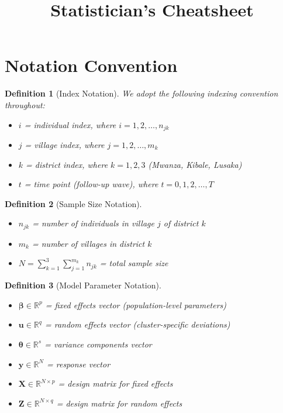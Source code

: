 \documentclass{article}
\title{Statistician's Cheatsheet}
\author{}
\date{}
\newtheorem{definition}{Definition}
\begin{document}
\maketitle
\newpage
\section{Notation Convention}

\begin{definition}[Index Notation]
We adopt the following indexing convention throughout:
\begin{itemize}
    \item $i$ = individual index, where $i = 1, 2, \ldots, n_{jk}$
    \item $j$ = village index, where $j = 1, 2, \ldots, m_k$
    \item $k$ = district index, where $k = 1, 2, 3$ (Mwanza, Kibale, Lusaka)
    \item $t$ = time point (follow-up wave), where $t = 0, 1, 2, \ldots, T$
\end{itemize}
\end{definition}

\begin{definition}[Sample Size Notation]
\begin{itemize}
    \item $n_{jk}$ = number of individuals in village $j$ of district $k$
    \item $m_k$ = number of villages in district $k$
    \item $N = \sum_{k=1}^{3} \sum_{j=1}^{m_k} n_{jk}$ = total sample size
\end{itemize}
\end{definition}

\begin{definition}[Model Parameter Notation]
\begin{itemize}
    \item $\boldsymbol{\beta} \in \mathbb{R}^p$ = fixed effects vector (population-level parameters)
    \item $\mathbf{u} \in \mathbb{R}^q$ = random effects vector (cluster-specific deviations)
    \item $\boldsymbol{\theta} \in \mathbb{R}^s$ = variance components vector
    \item $\mathbf{y} \in \mathbb{R}^N$ = response vector
    \item $\mathbf{X} \in \mathbb{R}^{N \times p}$ = design matrix for fixed effects
    \item $\mathbf{Z} \in \mathbb{R}^{N \times q}$ = design matrix for random effects
\end{itemize}
\end{definition}
\newpage
\end{document}
